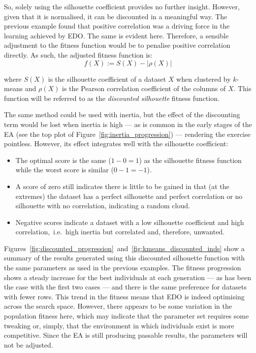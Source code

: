 So, solely using the silhouette coefficient provides no further insight.
However, given that it is normalised, it can be discounted in a meaningful way.
The previous example found that positive correlation was a driving force in the
learning achieved by EDO. The same is evident here. Therefore, a sensible
adjustment to the fitness function would be to penalise positive correlation
directly. As such, the adjusted fitness function is:
\begin{equation}\label{eq:discounted_silhouette}
f(X) := S(X) - \left|\rho(X)\right|
\end{equation}

\noindent where \(S(X)\) is the silhouette coefficient of a dataset \(X\) when
clustered by \(k\)-means and \(\rho(X)\) is the Pearson correlation coefficient
of the columns of \(X\). This function will be referred to as the
\emph{discounted silhouette} fitness function. 

The same method could be used with inertia, but the effect of the discounting
term would be lost when inertia is high --- as is common in the early stages of
the EA (see the top plot of Figure~\ref{fig:inertia_progression}) --- rendering
the exercise pointless. However, its effect integrates well with the silhouette
coefficient:
\begin{itemize}
    \item The optimal score is the same (\(1 - 0 = 1\)) as the silhouette
        fitness function while the worst score is similar (\(0-1=-1\)).
    \item A score of zero still indicates there is little to be gained in that
        (at the extremes) the dataset has a perfect silhouette and perfect
        correlation or no silhouette with no correlation, indicating a random
        cloud.
    \item Negative scores indicate a dataset with a low silhouette coefficient
        and high correlation,~i.e.\ high inertia but correlated and, therefore,
        unwanted.
\end{itemize}

Figures~\ref{fig:discounted_progression}~and~\ref{fig:kmeans_discounted_inds}
show a summary of the results generated using this discounted silhouette
function with the same parameters as used in the previous examples. The fitness
progression shows a steady increase for the best individuals at each generation
--- as has been the case with the first two cases --- and there is the same
preference for datasets with fewer rows. This trend in the fitness means that
EDO is indeed optimising across the search space. However,
there appears to be some variation in the population fitness here, which may
indicate that the parameter set requires some tweaking or, simply, that the
environment in which individuals exist is more competitive. Since the
EA is still producing passable results, the parameters will not be adjusted.

